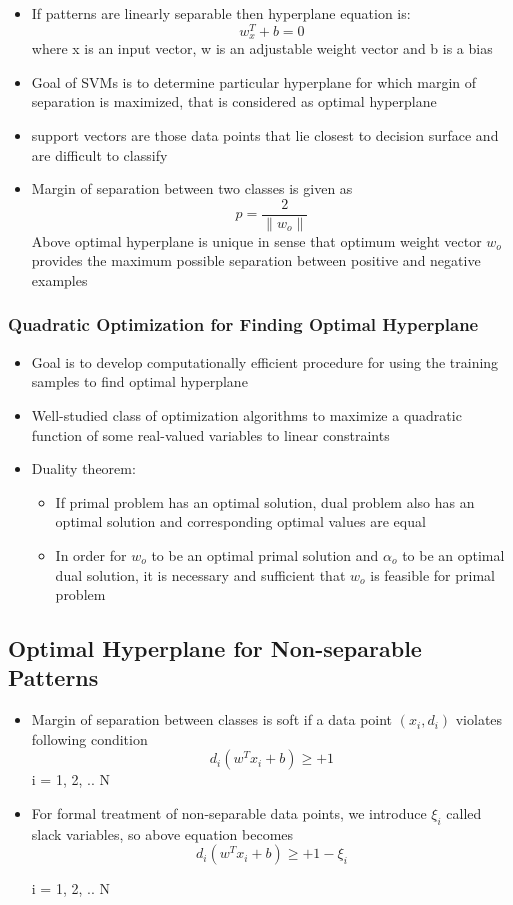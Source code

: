 \documentclass[12pt]{article}
\begin{document}
\begin{itemize}
	\item If patterns are linearly separable then hyperplane equation is: $$ w^T_x + b = 0$$
	where x is an input vector, w is an adjustable weight vector and b is a bias
	\item Goal of SVMs is to determine particular hyperplane for which margin of separation is maximized, that is considered as optimal hyperplane
	\item support vectors are those data points that lie closest to decision surface and are difficult to classify
	\item Margin of separation between two classes is given as $$ p = \frac{2}{\lVert w_{o}\rVert} $$
	Above optimal hyperplane is unique in sense that optimum weight vector $ w_{o} $ provides the maximum possible separation between positive and negative examples 
\end{itemize}

\subsubsection{Quadratic Optimization for Finding Optimal Hyperplane}

\begin{itemize}
	\item Goal is to develop computationally efficient procedure for using the training samples to find optimal hyperplane
	\item Well-studied class of optimization algorithms to maximize a quadratic function of some real-valued variables to linear constraints
	\item Duality theorem:
		\begin{itemize}
			\item If primal problem has an optimal solution, dual problem also has an optimal solution and corresponding optimal values are equal
			\item In order for $w_{o}$ to be an optimal primal solution and $\alpha_{o}$ to be an optimal dual solution, it is necessary and sufficient that $w_{o}$ is feasible for primal problem
		\end{itemize}
\end{itemize}

\subsection{Optimal Hyperplane for Non-separable Patterns}

\begin{itemize}
	\item Margin of separation between classes is soft if a data point $(x_i, d_i)$ violates following condition $$ d_{i} (w^Tx_{i} + b) \geq + 1$$
	i = 1, 2, .. N
	
	\item For formal treatment of non-separable data points, we introduce $\xi_{i}$ called slack variables, so above equation becomes $$ d_{i} (w^Tx_{i} + b) \geq + 1 - \xi_{i}$$
	
	i = 1, 2, .. N
	
\end{itemize}
\end{document}
